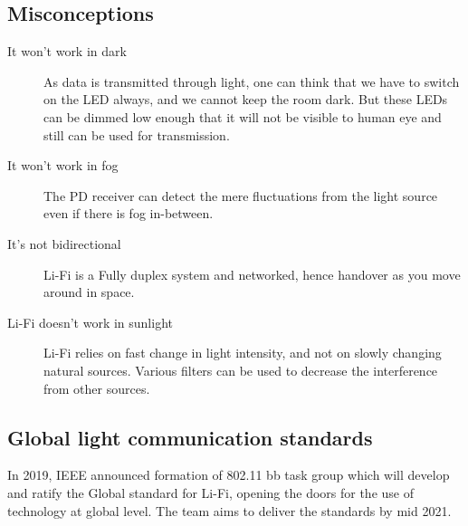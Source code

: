 \documentclass{article}
\begin{document}

\subsection{Misconceptions}

\begin{description}
    
    \item [It won't work in dark] As data is transmitted through light, one can think that we have to switch on the LED always, and we cannot keep the room dark. But these LEDs can be dimmed low enough that it will not be visible to human eye and still can be used for transmission.

    \item [It won't work in fog] The PD receiver can detect the mere fluctuations from the light source even if there is fog in-between.

    \item [It's not bidirectional] Li-Fi is a Fully duplex system and networked, hence handover as you move around in space.
    
    \item [Li-Fi doesn't work in sunlight] Li-Fi relies on fast change in light intensity, and not on slowly changing natural sources. Various filters can be used to decrease the interference from other sources.
    
\end{description}

\subsection{Global light communication standards{\cite{purelifi}}}

In 2019, IEEE announced formation of 802.11 bb task group which will develop and ratify the Global standard for Li-Fi, opening the doors for the use of technology at global level. 
The team aims to deliver the standards by mid 2021.



\printbibliography
\end{document}
